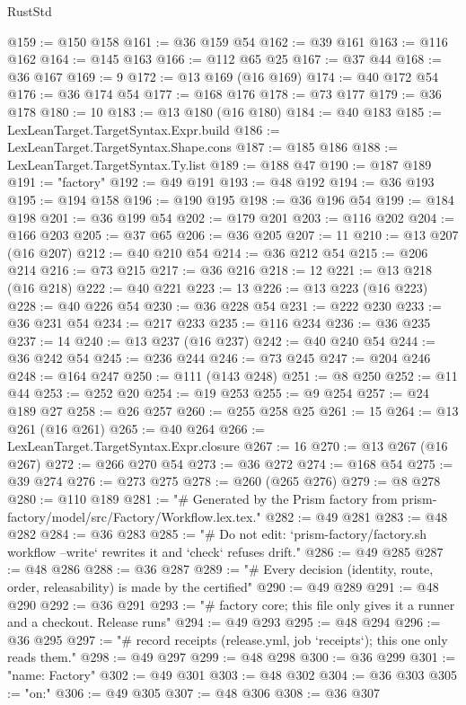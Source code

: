 \begin{lexlean}{RustStd}
\begin{coremodule}
@159 := @150 @158
@161 := @36 @159 @54
@162 := @39 @161
@163 := @116 @162
@164 := @145 @163
@166 := @112 @65 @25
@167 := @37 @44
@168 := @36 @167
@169 := 9
@172 := @13 @169 (@16 @169)
@174 := @40 @172 @54
@176 := @36 @174 @54
@177 := @168 @176
@178 := @73 @177
@179 := @36 @178
@180 := 10
@183 := @13 @180 (@16 @180)
@184 := @40 @183
@185 := LexLeanTarget.TargetSyntax.Expr.build
@186 := LexLeanTarget.TargetSyntax.Shape.cons
@187 := @185 @186
@188 := LexLeanTarget.TargetSyntax.Ty.list
@189 := @188 @47
@190 := @187 @189
@191 := "factory"
@192 := @49 @191
@193 := @48 @192
@194 := @36 @193
@195 := @194 @158
@196 := @190 @195
@198 := @36 @196 @54
@199 := @184 @198
@201 := @36 @199 @54
@202 := @179 @201
@203 := @116 @202
@204 := @166 @203
@205 := @37 @65
@206 := @36 @205
@207 := 11
@210 := @13 @207 (@16 @207)
@212 := @40 @210 @54
@214 := @36 @212 @54
@215 := @206 @214
@216 := @73 @215
@217 := @36 @216
@218 := 12
@221 := @13 @218 (@16 @218)
@222 := @40 @221
@223 := 13
@226 := @13 @223 (@16 @223)
@228 := @40 @226 @54
@230 := @36 @228 @54
@231 := @222 @230
@233 := @36 @231 @54
@234 := @217 @233
@235 := @116 @234
@236 := @36 @235
@237 := 14
@240 := @13 @237 (@16 @237)
@242 := @40 @240 @54
@244 := @36 @242 @54
@245 := @236 @244
@246 := @73 @245
@247 := @204 @246
@248 := @164 @247
@250 := @111 (@143 @248)
@251 := @8 @250
@252 := @11 @44
@253 := @252 @20
@254 := @19 @253
@255 := @9 @254
@257 := @24 @189 @27
@258 := @26 @257
@260 := @255 @258 @25
@261 := 15
@264 := @13 @261 (@16 @261)
@265 := @40 @264
@266 := LexLeanTarget.TargetSyntax.Expr.closure
@267 := 16
@270 := @13 @267 (@16 @267)
@272 := @266 @270 @54
@273 := @36 @272
@274 := @168 @54
@275 := @39 @274
@276 := @273 @275
@278 := @260 (@265 @276)
@279 := @8 @278
@280 := @110 @189
@281 := "# Generated by the Prism factory from prism-factory/model/src/Factory/Workflow.lex.tex."
@282 := @49 @281
@283 := @48 @282
@284 := @36 @283
@285 := "# Do not edit: `prism-factory/factory.sh workflow --write` rewrites it and `check` refuses drift."
@286 := @49 @285
@287 := @48 @286
@288 := @36 @287
@289 := "# Every decision (identity, route, order, releasability) is made by the certified"
@290 := @49 @289
@291 := @48 @290
@292 := @36 @291
@293 := "# factory core; this file only gives it a runner and a checkout. Release runs"
@294 := @49 @293
@295 := @48 @294
@296 := @36 @295
@297 := "# record receipts (release.yml, job `receipts`); this one only reads them."
@298 := @49 @297
@299 := @48 @298
@300 := @36 @299
@301 := "name: Factory"
@302 := @49 @301
@303 := @48 @302
@304 := @36 @303
@305 := "on:"
@306 := @49 @305
@307 := @48 @306
@308 := @36 @307

\end{coremodule}
\end{lexlean}
